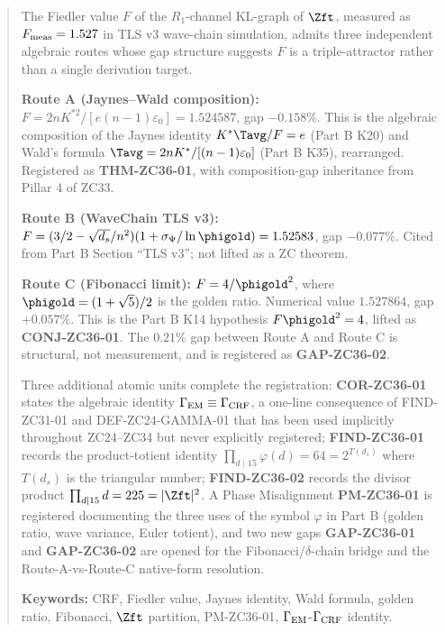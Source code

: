 \documentclass[12pt, a4paper]{article}
\begin{document}
\begin{abstract}
\sloppy
The Fiedler value $F$ of the $R_1$-channel KL-graph of $\Zft$,
measured as $F_{\rm meas} = 1.527$ in TLS v3 wave-chain
simulation, admits three independent algebraic routes whose
gap structure suggests $F$ is a triple-attractor rather than a
single derivation target.

\noindent\textbf{Route A (Jaynes--Wald composition):}
$F = 2nK^{*2}/[e(n-1)\varepsilon_0] = 1.524587$, gap $-0.158\%$.
This is the algebraic composition of the Jaynes identity
$K^*\Tavg/F = e$ (Part B K20) and Wald's formula
$\Tavg = 2nK^*/[(n-1)\varepsilon_0]$ (Part B K35), rearranged.
Registered as \textbf{THM-ZC36-01}, with composition-gap
inheritance from Pillar 4 of ZC33.

\noindent\textbf{Route B (WaveChain TLS v3):}
$F = (3/2 - \sqrt{d_s}/n^2)(1 + \sigma_\Psi/\ln\phigold) = 1.52583$,
gap $-0.077\%$. Cited from Part B Section ``TLS v3''; not
lifted as a ZC theorem.

\noindent\textbf{Route C (Fibonacci limit):}
$F = 4/\phigold^2$, where $\phigold = (1+\sqrt 5)/2$ is the
golden ratio. Numerical value $1.527864$, gap $+0.057\%$.
This is the Part B K14 hypothesis $F\phigold^2 = 4$, lifted as
\textbf{CONJ-ZC36-01}. The $0.21\%$ gap between Route A and
Route C is structural, not measurement, and is registered as
\textbf{GAP-ZC36-02}.

\noindent Three additional atomic units complete the
registration:
\textbf{COR-ZC36-01} states the algebraic identity
$\Gamma_{\rm EM} \equiv \Gamma_{\rm CRF}$, a one-line
consequence of FIND-ZC31-01 and DEF-ZC24-GAMMA-01 that has
been used implicitly throughout ZC24--ZC34 but never explicitly
registered;
\textbf{FIND-ZC36-01} records the product-totient identity
$\prod_{d \mid 15} \varphi(d) = 64 = 2^{T(d_s)}$ where $T(d_s)$
is the triangular number;
\textbf{FIND-ZC36-02} records the divisor product
$\prod_{d \mid 15} d = 225 = |\Zft|^2$.
A Phase Misalignment \textbf{PM-ZC36-01} is registered
documenting the three uses of the symbol $\varphi$ in Part B
(golden ratio, wave variance, Euler totient), and two new
gaps \textbf{GAP-ZC36-01} and \textbf{GAP-ZC36-02} are opened
for the Fibonacci/$\delta$-chain bridge and the
Route-A-vs-Route-C native-form resolution.

\medskip
\noindent\textbf{Keywords:} CRF, Fiedler value, Jaynes identity,
Wald formula, golden ratio, Fibonacci, $\Zft$ partition,
PM-ZC36-01, $\Gamma_{\rm EM}$-$\Gamma_{\rm CRF}$ identity.
\end{abstract}
\end{document}
